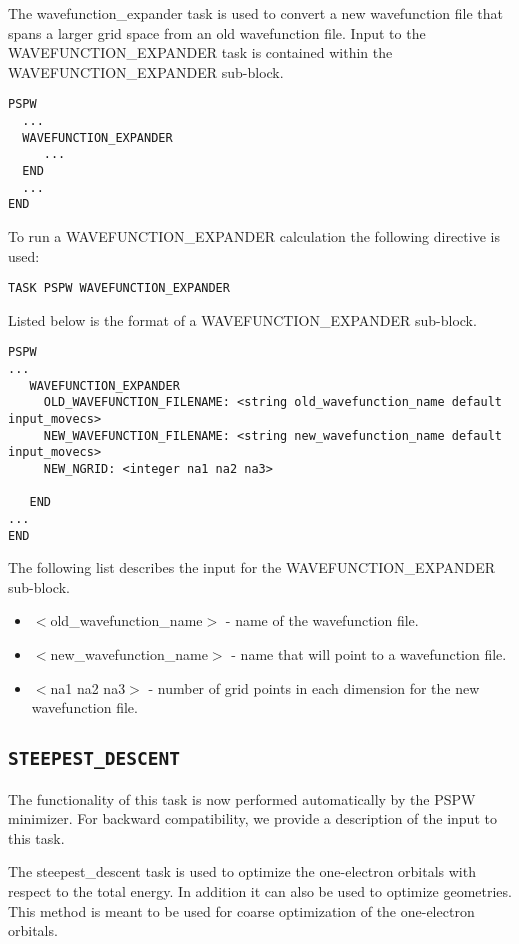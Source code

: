 The wavefunction\_expander task is used to convert a new wavefunction
file that spans a larger grid space from an old wavefunction file.
Input to the WAVEFUNCTION\_EXPANDER task is contained
within the WAVEFUNCTION\_EXPANDER sub-block.
\begin{verbatim}
PSPW
  ...
  WAVEFUNCTION_EXPANDER
     ...
  END
  ...
END
\end{verbatim}
To run a WAVEFUNCTION\_EXPANDER calculation the following directive 
is used:
\begin{verbatim}
TASK PSPW WAVEFUNCTION_EXPANDER
\end{verbatim}
Listed below is the format of a WAVEFUNCTION\_EXPANDER sub-block.
\begin{verbatim}
PSPW
... 
   WAVEFUNCTION_EXPANDER   
     OLD_WAVEFUNCTION_FILENAME: <string old_wavefunction_name default input_movecs>
     NEW_WAVEFUNCTION_FILENAME: <string new_wavefunction_name default input_movecs>
     NEW_NGRID: <integer na1 na2 na3>
    
   END
...
END
\end{verbatim}
The following list describes the input for the WAVEFUNCTION\_EXPANDER
sub-block.
\begin{itemize}
        \item $<$old\_wavefunction\_name$>$ - name of the
              wavefunction file.
        \item $<$new\_wavefunction\_name$>$ - name that will 
              point to a wavefunction file.
        \item $<$na1 na2 na3$>$ - number of grid points in each dimension
              for the new wavefunction file. 
\end{itemize}

\subsection{\tt STEEPEST\_DESCENT} 
\label{sec:pspw_steepest_descent}
The functionality of this task is now performed automatically by the PSPW minimizer. 
For backward compatibility, we provide a description of the input to this task.

The steepest\_descent task is used to optimize the one-electron orbitals
with respect to the total energy.  In addition it can also be used to optimize
geometries.   This method is meant to be used for coarse optimization of
the one-electron orbitals.

